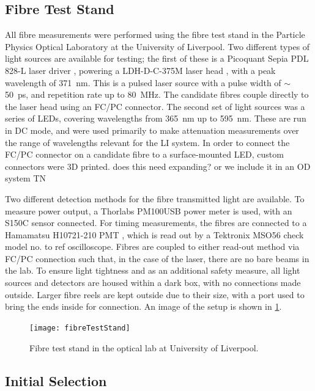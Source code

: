\documentclass[a4paper,11pt]{article}
\let\oldsim\sim
\renewcommand{\sim}{{\oldsim}}
\begin{document}
\subsection{Fibre Test Stand}\label{sec:meas:sub:stand}

All fibre measurements were performed using the fibre test stand in the Particle Physics Optical Laboratory at the University of Liverpool. Two different types of light sources are available for testing; the first of these is a Picoquant Sepia PDL 828-L laser driver \cite{bib:laserdriver}, powering a LDH-D-C-375M laser head \cite{bib:laserhead}, with a peak wavelength of 371~nm. This is a pulsed laser source with a pulse width of $\sim$50~ps, and repetition rate up to 80~MHz. The candidate fibres couple directly to the laser head using an FC/PC connector. The second set of light sources was a series of LEDs, covering wavelengths from 365~nm up to 595~nm. These are run in DC mode, and were used primarily to make attenuation measurements over the range of wavelengths relevant for the LI system. In order to connect the FC/PC connector on a candidate fibre to a surface-mounted LED, custom connectors were 3D printed. {\color{red} does this need expanding? or we include it in an OD system TN}

Two different detection methods for the fibre transmitted light are available. To measure power output, a Thorlabs PM100USB \cite{bib:opm} power meter is used, with an S150C sensor \cite{bib:opmsensor} connected. For timing measurements, the fibres are connected to a Hamamatsu H10721-210 PMT \cite{bib:hpmt}, which is read out by a Tektronix MSO56{\color{red} check model no. to ref} oscilloscope. Fibres are coupled to either read-out method via FC/PC connection such that, in the case of the laser, there are no bare beams in the lab. To ensure light tightness and as an additional safety measure, all light sources and detectors are housed within a dark box, with no connections made outside. Larger fibre reels are kept outside due to their size, with a port used to bring the ends inside for connection. An image of the setup is shown in \cref{fig:fibreteststand}.

\begin{figure}[h]
\centering
\texttt{[image: fibreTestStand]}
\caption{Fibre test stand in the optical lab at University of Liverpool.}\label{fig:fibreteststand}
\end{figure}

\subsection{Initial Selection}
\end{document}

